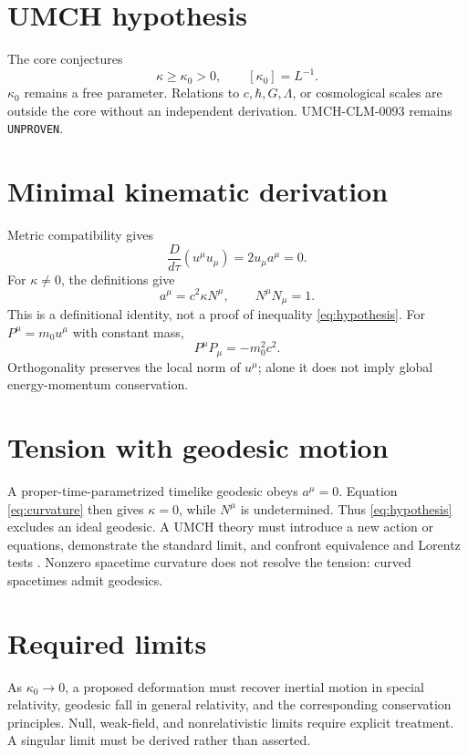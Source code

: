 \documentclass[11pt,a4paper]{article}
\begin{document}
\section{UMCH hypothesis}\label{sec:hypothesis}
The core conjectures
\begin{equation}\label{eq:hypothesis}
\kappa\ge\kappa_0>0,\qquad [\kappa_0]=L^{-1}.
\end{equation}
$\kappa_0$ remains a free parameter. Relations to $c,\hbar,G,\Lambda$, or cosmological scales are outside the core without an independent derivation. UMCH-CLM-0093 remains \texttt{UNPROVEN}.

\section{Minimal kinematic derivation}\label{sec:derivation}
Metric compatibility gives
\begin{equation}\label{eq:orthogonality}
\frac{D}{d\tau}(u^\mu u_\mu)=2u_\mu a^\mu=0.
\end{equation}
For $\kappa\ne0$, the definitions give
\begin{equation}\label{eq:frenet}
a^\mu=c^2\kappa N^\mu,\qquad N^\mu N_\mu=1.
\end{equation}
This is a definitional identity, not a proof of inequality \eqref{eq:hypothesis}. For $P^\mu=m_0u^\mu$ with constant mass,
\begin{equation}\label{eq:momentum}
P^\mu P_\mu=-m_0^2c^2.
\end{equation}
Orthogonality preserves the local norm of $u^\mu$; alone it does not imply global energy-momentum conservation.

\section{Tension with geodesic motion}\label{sec:tension}
A proper-time-parametrized timelike geodesic obeys $a^\mu=0$. Equation \eqref{eq:curvature} then gives $\kappa=0$, while $N^\mu$ is undetermined. Thus \eqref{eq:hypothesis} excludes an ideal geodesic. A UMCH theory must introduce a new action or equations, demonstrate the standard limit, and confront equivalence and Lorentz tests \cite{Will2014}. Nonzero spacetime curvature does not resolve the tension: curved spacetimes admit geodesics.

\section{Required limits}\label{sec:limits}
As $\kappa_0\to0$, a proposed deformation must recover inertial motion in special relativity, geodesic fall in general relativity, and the corresponding conservation principles. Null, weak-field, and nonrelativistic limits require explicit treatment. A singular limit must be derived rather than asserted.
\end{document}
